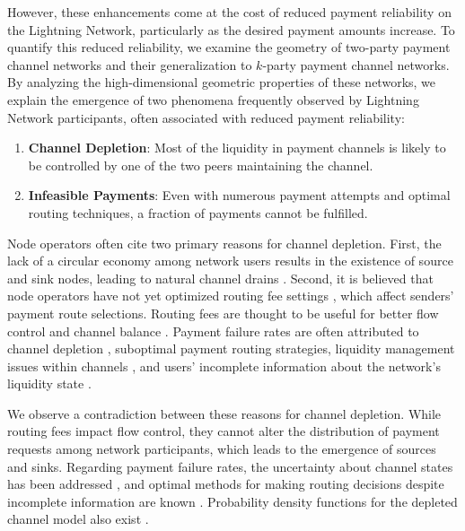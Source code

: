 \documentclass[10pt,twocolumn]{article}
\begin{document}
However, these enhancements come at the cost of reduced payment reliability on the Lightning Network, particularly as the desired payment amounts increase. To quantify this reduced reliability, we examine the geometry of two-party payment channel networks and their generalization to \( k \)-party payment channel networks. By analyzing the high-dimensional geometric properties of these networks, we explain the emergence of two phenomena frequently observed by Lightning Network participants, often associated with reduced payment reliability:

\begin{enumerate}
\item \textbf{Channel Depletion}: Most of the liquidity in payment channels is likely to be controlled by one of the two peers maintaining the channel.
\item \textbf{Infeasible Payments}: Even with numerous payment attempts and optimal routing techniques, a fraction of payments cannot be fulfilled.
\end{enumerate}

Node operators often cite two primary reasons for channel depletion. First, the lack of a circular economy among network users results in the existence of source and sink nodes, leading to natural channel drains \cite{pickhardt2022valves}. Second, it is believed that node operators have not yet optimized routing fee settings \cite{zhang2023rethinking}, which affect senders' payment route selections. Routing fees are thought to be useful for better flow control and channel balance \cite{ren2018optimal}. Payment failure rates are often attributed to channel depletion \cite{alscher2023price}, suboptimal payment routing strategies, liquidity management issues within channels \cite{pickhardt2020imbalance}, and users' incomplete information about the network's liquidity state \cite{pickhardt2021security}.

We observe a contradiction between these reasons for channel depletion. While routing fees impact flow control, they cannot alter the distribution of payment requests among network participants, which leads to the emergence of sources and sinks. Regarding payment failure rates, the uncertainty about channel states has been addressed \cite{pickhardt2021security}, and optimal methods for making routing decisions despite incomplete information are known \cite{pickhardt2021optimally}. Probability density functions for the depleted channel model also exist \cite{bitromortac2024blazing,rossi2024channel}.
\end{document}
